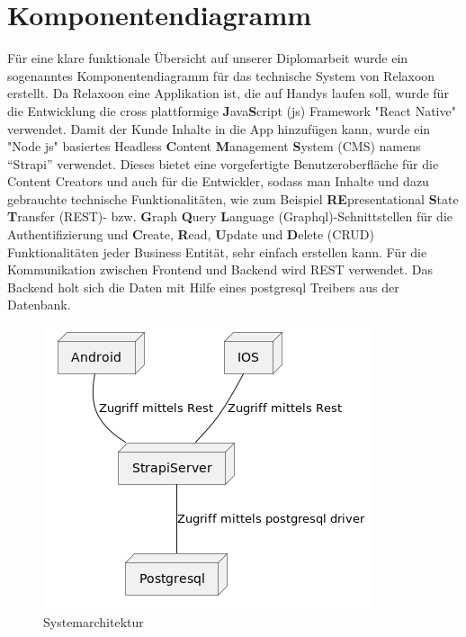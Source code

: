 \section{Komponentendiagramm}

Für eine klare funktionale Übersicht auf unserer Diplomarbeit
wurde ein sogenanntes Komponentendiagramm für das technische System von Relaxoon erstellt.
Da Relaxoon eine Applikation ist, die auf Handys laufen soll,
wurde für die Entwicklung die cross plattformige \textbf{J}ava\textbf{S}cript  (js)
Framework "React Native" verwendet. Damit der Kunde Inhalte in die App hinzufügen kann,
wurde ein "Node js" basiertes Headless \textbf{C}ontent \textbf{M}anagement \textbf{S}ystem (CMS)
namens “Strapi” verwendet.
Dieses bietet eine vorgefertigte Benutzeroberfläche für die Content Creators
und auch für die Entwickler, sodass man Inhalte und dazu gebrauchte technische Funktionalitäten, wie zum Beispiel
\textbf{RE}presentational \textbf{S}tate \textbf{T}ransfer (REST)- bzw. \textbf{G}raph \textbf{Q}uery \textbf{L}anguage (Graphql)-Schnittstellen
für die Authentifizierung und \textbf{C}reate, \textbf{R}ead, \textbf{U}pdate und \textbf{D}elete (CRUD)
Funktionalitäten jeder Business Entität, sehr einfach erstellen kann.
Für die Kommunikation zwischen Frontend und Backend wird REST verwendet. Das Backend holt sich die Daten mit Hilfe eines postgresql Treibers aus der Datenbank.


\begin{figure}[H]
    \centering
    \includegraphics{./pics/system-architektur.png}
    \caption{Systemarchitektur}
    \label{fig:Systemarchitektur}
\end{figure}